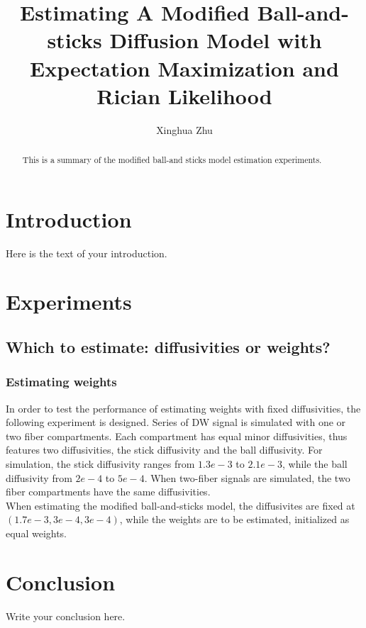 \documentclass{article}
\begin{document}
\title{Estimating A Modified Ball-and-sticks Diffusion Model with Expectation Maximization and Rician Likelihood}
\author{Xinghua Zhu}

\maketitle

\begin{abstract}
  This is a summary of the modified ball-and sticks model estimation experiments.
\end{abstract}

\section{Introduction}
Here is the text of your introduction.

\section{Experiments}

\subsection{Which to estimate: diffusivities or weights?}
\subsubsection{Estimating weights}

In order to test the performance of estimating weights with fixed diffusivities, the following experiment is designed. Series of DW signal is simulated with one or two fiber compartments. Each compartment has equal minor diffusivities, thus features two diffusivities, the stick diffusivity and the ball diffusivity. For simulation, the stick diffusivity ranges from $1.3e-3$ to $2.1e-3$, while the ball diffusivity from $2e-4$ to $5e-4$. When two-fiber signals are simulated, the two fiber compartments have the same diffusivities.\\

When estimating the modified ball-and-sticks model, the diffusivites are fixed at $(1.7e-3, 3e-4, 3e-4)$, while the weights are to be estimated, initialized as equal weights.

\section{Conclusion}
Write your conclusion here.
\end{document}
